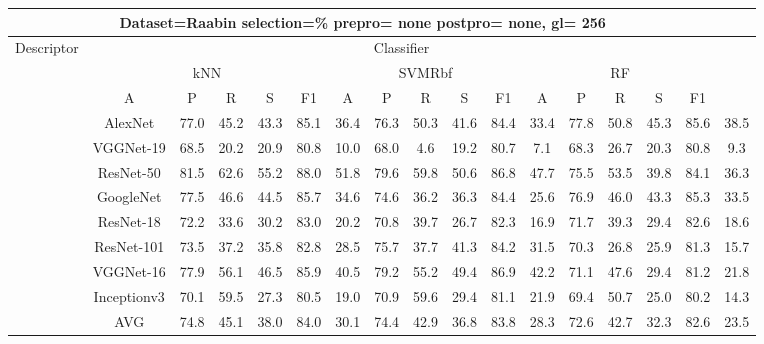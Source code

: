 \documentclass[12pt,italian]{article}
\begin{document}
\begin{tiny}
\begin{longtable}{lcccccccccccccccc}
\toprule
\multicolumn{16}{c}{Dataset=Raabin selection=\% prepro= none postpro= none, gl= 256} \\ 
\toprule
Descriptor & \multicolumn{15}{c}{Classifier} \\ 
& \multicolumn{5}{c}{kNN} & \multicolumn{5}{c}{SVMRbf} & \multicolumn{5}{c}{RF} \\ 
& A & P & R & S & F1 & A & P & R & S & F1 & A & P & R & S & F1 \\ 
\midrule
& AlexNet & 77.0 & 45.2 & 43.3 & 85.1 & 36.4 & 76.3 & 50.3 & 41.6 & 84.4 & 33.4 & 77.8 & 50.8 & 45.3 & 85.6 & 38.5 \\ 
& VGGNet-19 & 68.5 & 20.2 & 20.9 & 80.8 & 10.0 & 68.0 &  4.6 & 19.2 & 80.7 &  7.1 & 68.3 & 26.7 & 20.3 & 80.8 &  9.3 \\ 
& ResNet-50 & 81.5 & 62.6 & 55.2 & 88.0 & 51.8 & 79.6 & 59.8 & 50.6 & 86.8 & 47.7 & 75.5 & 53.5 & 39.8 & 84.1 & 36.3 \\ 
& GoogleNet & 77.5 & 46.6 & 44.5 & 85.7 & 34.6 & 74.6 & 36.2 & 36.3 & 84.4 & 25.6 & 76.9 & 46.0 & 43.3 & 85.3 & 33.5 \\ 
& ResNet-18 & 72.2 & 33.6 & 30.2 & 83.0 & 20.2 & 70.8 & 39.7 & 26.7 & 82.3 & 16.9 & 71.7 & 39.3 & 29.4 & 82.6 & 18.6 \\ 
& ResNet-101 & 73.5 & 37.2 & 35.8 & 82.8 & 28.5 & 75.7 & 37.7 & 41.3 & 84.2 & 31.5 & 70.3 & 26.8 & 25.9 & 81.3 & 15.7 \\ 
& VGGNet-16 & 77.9 & 56.1 & 46.5 & 85.9 & 40.5 & 79.2 & 55.2 & 49.4 & 86.9 & 42.2 & 71.1 & 47.6 & 29.4 & 81.2 & 21.8 \\ 
& Inceptionv3 & 70.1 & 59.5 & 27.3 & 80.5 & 19.0 & 70.9 & 59.6 & 29.4 & 81.1 & 21.9 & 69.4 & 50.7 & 25.0 & 80.2 & 14.3 \\ 
\hline
& AVG & 74.8 & 45.1 & 38.0 & 84.0 & 30.1 & 74.4 & 42.9 & 36.8 & 83.8 & 28.3 & 72.6 & 42.7 & 32.3 & 82.6 & 23.5 \\ 
\hline
\bottomrule
\end{longtable} 

 \pagebreak 
\end{tiny} 
 
\end{document}
